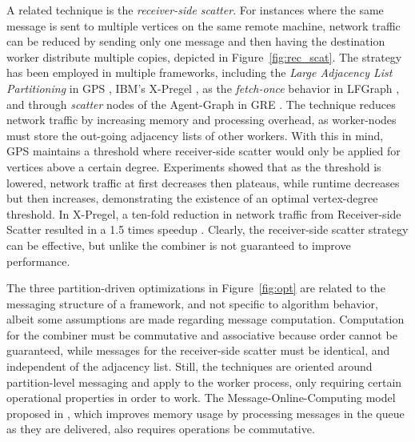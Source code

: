\documentclass[reprint,twocolumn,showpacs,preprintnumbers,amsmath, aps,pre,amssymb]{revtex4-1}
\begin{document}
A related technique is the {\em receiver-side scatter}.  For instances where the same message is sent to multiple vertices on the same remote machine, network traffic can be reduced by sending only one message and then having the destination worker distribute multiple copies, depicted in Figure~\ref{fig:rec_scat}.  The strategy has been employed in multiple frameworks, including the \textit{Large Adjacency List Partitioning} in GPS \cite{Salihoglu2013}, IBM's X-Pregel \cite{Bao2013}, as the \textit{fetch-once} behavior in LFGraph \cite{Hoque2013}, and through \textit{scatter} nodes of the Agent-Graph in GRE \cite{Yan2013}.  The technique reduces network traffic by increasing memory and processing overhead, as worker-nodes must store the out-going adjacency lists of other workers.  With this in mind, GPS maintains a threshold where receiver-side scatter would only be applied for vertices above a certain degree.  Experiments showed that as the threshold is lowered, network traffic at first decreases then plateaus, while runtime decreases but then increases, demonstrating the existence of an optimal vertex-degree threshold.  In X-Pregel, a ten-fold reduction in network traffic from Receiver-side Scatter resulted in a 1.5 times speedup \cite{Bao2013}. Clearly, the receiver-side scatter strategy can be effective, but unlike the combiner is not guaranteed to improve performance.

The three partition-driven optimizations in Figure~\ref{fig:opt} are related to the messaging structure of a framework, and not specific to algorithm behavior, albeit some assumptions are made regarding message computation.  Computation for the combiner must be commutative and associative because order cannot be guaranteed, while messages for the receiver-side scatter must be identical, and independent of the adjacency list.  Still, the techniques are oriented around partition-level messaging and apply to the worker process, only requiring certain operational properties in order to work.  The Message-Online-Computing model proposed in \cite{Zhou2014}, which improves memory usage by processing messages in the queue as they are delivered, also requires operations be commutative.
\end{document}
